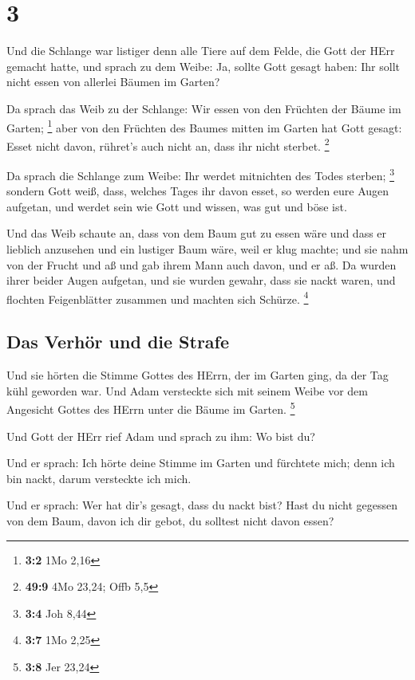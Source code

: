 \hypertarget{section-2}{%
\section{3}\label{section-2}}

 Und die Schlange war listiger denn alle Tiere auf dem
Felde, die Gott der HErr gemacht hatte, und sprach zu dem Weibe: Ja,
sollte Gott gesagt haben: Ihr sollt nicht essen von allerlei Bäumen im
Garten?

 Da sprach das Weib zu der Schlange: Wir essen von den
Früchten der Bäume im Garten; \footnote{\textbf{3:2} 1Mo 2,16}
 aber von den Früchten des Baumes mitten im Garten hat
Gott gesagt: Esset nicht davon, rühret's auch nicht an, dass ihr nicht
sterbet. \footnote{\textbf{49:9} 4Mo 23,24; Offb 5,5}

 Da sprach die Schlange zum Weibe: Ihr werdet mitnichten
des Todes sterben; \footnote{\textbf{3:4} Joh 8,44} 
sondern Gott weiß, dass, welches Tages ihr davon esset, so werden eure
Augen aufgetan, und werdet sein wie Gott und wissen, was gut und böse
ist.

 Und das Weib schaute an, dass von dem Baum gut zu essen
wäre und dass er lieblich anzusehen und ein lustiger Baum wäre, weil er
klug machte; und sie nahm von der Frucht und aß und gab ihrem Mann auch
davon, und er aß.  Da wurden ihrer beider Augen aufgetan,
und sie wurden gewahr, dass sie nackt waren, und flochten Feigenblätter
zusammen und machten sich Schürze. \footnote{\textbf{3:7} 1Mo 2,25}

\hypertarget{das-verhuxf6r-und-die-strafe}{%
\subsection{Das Verhör und die
Strafe}\label{das-verhuxf6r-und-die-strafe}}

 Und sie hörten die Stimme Gottes des HErrn, der im Garten
ging, da der Tag kühl geworden war. Und Adam versteckte sich mit seinem
Weibe vor dem Angesicht Gottes des HErrn unter die Bäume im Garten.
\footnote{\textbf{3:8} Jer 23,24}

 Und Gott der HErr rief Adam und sprach zu ihm: Wo bist
du?

 Und er sprach: Ich hörte deine Stimme im Garten und
fürchtete mich; denn ich bin nackt, darum versteckte ich mich.

 Und er sprach: Wer hat dir's gesagt, dass du nackt bist?
Hast du nicht gegessen von dem Baum, davon ich dir gebot, du solltest
nicht davon essen?


